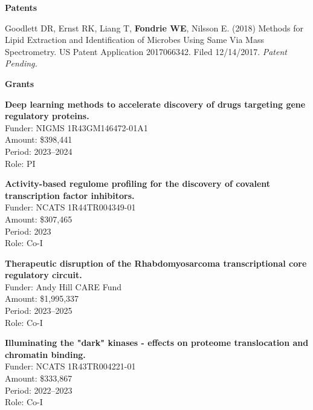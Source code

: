 \documentclass[11pt]{article}
\newcommand{\mysection}[1]{\vspace{1ex} \textbf{\large \textsf{#1} \quad \hrulefill}}
\begin{document}
\mysection{Patents}
\begin{etaremune}
  \item Goodlett DR, Ernst RK, Liang T, \textbf{Fondrie WE}, Nilsson E. (2018)
  Methods for Lipid Extraction and Identification of Microbes Using Same Via
  Mass Spectrometry. US Patent Application 2017066342. Filed 12/14/2017. {\it
    Patent Pending.}
\end{etaremune}

\mysection{Grants}
\begin{etaremune}
  \item \textbf{Deep learning methods to accelerate discovery of drugs targeting gene regulatory proteins.} \\
  Funder: NIGMS 1R43GM146472-01A1 \\
  Amount: \$398,441\\
  Period: 2023--2024 \\
  Role: PI \\

  \item \textbf{Activity-based regulome profiling for the discovery of covalent transcription factor inhibitors.} \\
  Funder: NCATS 1R44TR004349-01 \\
  Amount: \$307,465\\
  Period: 2023 \\
  Role: Co-I

  \item \textbf{Therapeutic disruption of the Rhabdomyosarcoma transcriptional core regulatory circuit.} \\
  Funder: Andy Hill CARE Fund \\
  Amount: \$1,995,337\\
  Period: 2023--2025 \\
  Role: Co-I

  \item \textbf{Illuminating the "dark" kinases - effects on proteome translocation and chromatin binding.} \\
  Funder: NCATS 1R43TR004221-01 \\
  Amount: \$333,867 \\
  Period: 2022--2023 \\
  Role: Co-I

\end{etaremune}
\end{document}
